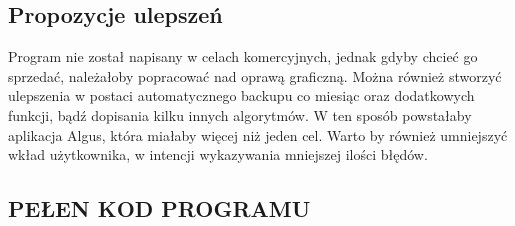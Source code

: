 \documentclass[12pt,a4paper]{article}
\begin{document}
	\subsection{Propozycje ulepszeń}
	\hspace{20} Program nie został napisany w celach komercyjnych, jednak gdyby chcieć go sprzedać, należałoby popracować nad oprawą graficzną. Można również stworzyć ulepszenia w postaci automatycznego backupu co miesiąc oraz dodatkowych funkcji, bądź dopisania kilku innych algorytmów. W ten sposób powstałaby aplikacja Algus, która miałaby więcej niż jeden cel. Warto by również umniejszyć wkład użytkownika, w intencji wykazywania mniejszej ilości błędów.
   \newpage
   \begin{center}
       \subsection*{PEŁEN KOD PROGRAMU}
   \end{center}
\end{document}
